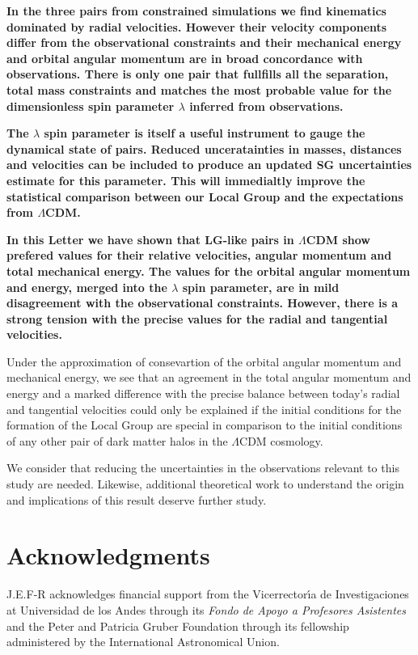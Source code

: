 \documentclass{emulateapj}
\begin{document}
{\bf In the three pairs from constrained simulations we find kinematics dominated by radial velocities. However their velocity components differ from the observational constraints and their mechanical energy and orbital angular momentum are in broad concordance with observations. There is only one pair that fullfills all the separation, total mass constraints and matches the most probable value for the dimensionless spin parameter $\lambda$ inferred from observations. }

{\bf The $\lambda$ spin parameter is itself a useful instrument to gauge the dynamical state of pairs. Reduced unceratainties in masses, distances and velocities can be included to produce an updated
SG uncertainties
 estimate for this parameter. This will immedialtly improve the statistical comparison between our Local Group and the expectations from $\Lambda$CDM.}

{\bf In this Letter we have shown that LG-like pairs in $\Lambda$CDM show prefered values for their relative velocities, angular momentum and total mechanical energy. The values for the orbital angular momentum and energy, merged into the $\lambda$ spin parameter, are in mild disagreement with the observational constraints. However, there is a strong tension with the precise values for the radial and tangential velocities.

Under the approximation of consevartion of the orbital angular momentum and mechanical energy, we see that an agreement in the total angular momentum and energy and a marked difference with the precise balance between today's radial and tangential velocities could only be explained if the initial conditions for the formation of the Local Group are special in comparison to the initial conditions of any other pair of dark matter halos in the $\Lambda$CDM cosmology. 

We consider that reducing the uncertainties in the observations relevant to this study are needed. Likewise, additional theoretical work to understand the origin and implications of this result deserve further study.}

\label{sec:conclusions}
\section*{Acknowledgments}  
J.E.F-R acknowledges financial support from the Vicerrector\'{\i}a de Investigaciones at Universidad de los Andes through its {\it Fondo de Apoyo a Profesores Asistentes} and the Peter and Patricia Gruber Foundation through its fellowship administered by the International Astronomical Union.
\end{document}
